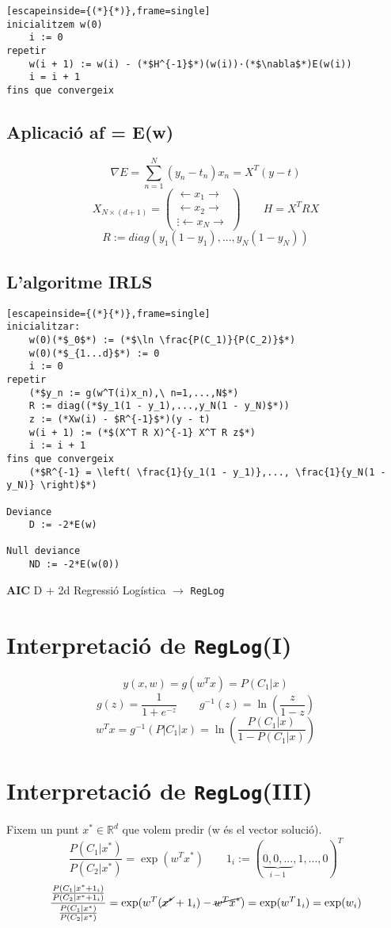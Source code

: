 \documentclass[a4paper]{article}
\begin{document}
\begin{lstlisting}[escapeinside={(*}{*)},frame=single]
inicialitzem w(0)
	i := 0
repetir
	w(i + 1) := w(i) - (*$H^{-1}$*)(w(i))·(*$\nabla$*)E(w(i))
	i = i + 1
fins que convergeix
\end{lstlisting}

\subsection{Aplicació af = E(w)}

$$
\nabla E = \sum_{n=1}^N (y_n - t_n) x_n = X^T(y-t)
$$
$$
X_{N\times (d+1)} =
\begin{pmatrix}
\longleftarrow x_1 \longrightarrow \\
\longleftarrow x_2 \longrightarrow \\
\vdots
\longleftarrow x_N \longrightarrow
\end{pmatrix}
\qquad
H = X^T R X
$$
$$
R := diag(y_1(1 - y_1), ..., y_N(1 - y_N))
$$


\subsection{L'algoritme IRLS}
\begin{lstlisting}[escapeinside={(*}{*)},frame=single]
inicialitzar: 
	w(0)(*$_0$*) := (*$\ln \frac{P(C_1)}{P(C_2)}$*)
	w(0)(*$_{1...d}$*) := 0
	i := 0
repetir
	(*$y_n := g(w^T(i)x_n),\ n=1,...,N$*)
	R := diag((*$y_1(1 - y_1),...,y_N(1 - y_N)$*))
	z := (*Xw(i) - $R^{-1}$*)(y - t)
	w(i + 1) := (*$(X^T R X)^{-1} X^T R z$*)
	i := i + 1
fins que convergeix
	(*$R^{-1} = \left( \frac{1}{y_1(1 - y_1)},..., \frac{1}{y_N(1 - y_N)} \right)$*)

Deviance
	D := -2*E(w)
	
Null deviance
	ND := -2*E(w(0))
\end{lstlisting}

\textbf{AIC} D + 2d
Regressió Logística $\rightarrow$ \texttt{RegLog}

\section{Interpretació de \texttt{RegLog}(I)}
$$
y(x, w) = g(w^T x) = P(C_1|x)
$$
$$
g(z) = \frac{1}{1 + e^{-z}} \qquad g^{-1}(z) =  \ln\left(\frac{z}{1 - z}\right)
$$
$$
w^T x = g^{-1} (P|C_1|x) = \ln\left( \frac{P(C_1|x)}{1 - P(C_1|x)} \right)
$$

\section{Interpretació de \texttt{RegLog}(III)}
Fixem un punt $x^* \in \mathbb{R}^d$ que volem predir (w és el vector solució).
$$
\frac{P(C_1|x^*)}{P(C_2|x^*)} = \exp(w^T x^*)
\qquad 1_i := (\underbrace{0,0,...}_{i - 1},1,...,0)^T
$$
$$
\frac{\frac{P(C_1|x^* + 1_i)}{P(C_2|x^* + 1_i)}}{\frac{P(C_1|x^*)}{P(C_2|x^*)}} =
\exp(w^T(\cancel{x^*} + 1_i) - \cancel{w^T x^*}) = 
\exp(w^T 1_i) = \exp(w_i)
$$
\end{document}
